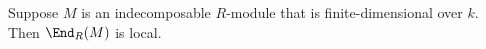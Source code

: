 Suppose $M$ is an indecomposable $R$-module that is finite-dimensional over
$k$. Then $\End_R(M)$ is local.
